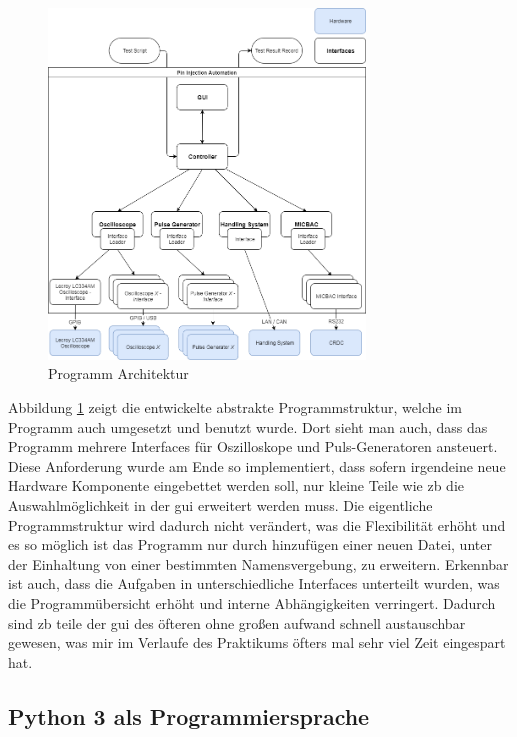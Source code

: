 \begin{figure}[H]
	\centering
	\includegraphics[width=0.75\textwidth, height=0.75\textwidth]{graphics/program_architecture.png}
	\caption{Programm Architektur}
	\label{fig:prg_architecture}
\end{figure}

Abbildung \ref{fig:prg_architecture} zeigt die entwickelte abstrakte Programmstruktur,
welche im Programm auch umgesetzt und benutzt wurde. Dort sieht man auch, dass das Programm
mehrere Interfaces für Oszilloskope und Puls-Generatoren ansteuert. Diese Anforderung wurde am
Ende so implementiert, dass sofern irgendeine neue Hardware Komponente eingebettet werden soll,
nur kleine Teile wie \ac{zb} die Auswahlmöglichkeit in der \ac{gui} erweitert werden muss. Die
eigentliche Programmstruktur wird dadurch nicht verändert, was die Flexibilität erhöht und es
so möglich ist das Programm nur durch hinzufügen einer neuen Datei, unter der Einhaltung von
einer bestimmten  Namensvergebung, zu erweitern. Erkennbar ist auch, dass die Aufgaben in
unterschiedliche Interfaces unterteilt wurden, was die Programmübersicht erhöht und  interne
Abhängigkeiten verringert. Dadurch sind \ac{zb} teile der \ac{gui} des öfteren ohne großen
aufwand schnell austauschbar gewesen, was mir im Verlaufe des Praktikums öfters mal sehr viel
Zeit eingespart hat.

	
\subsection{Python 3 als Programmiersprache}
\label{subsec:py3_as_lang}

